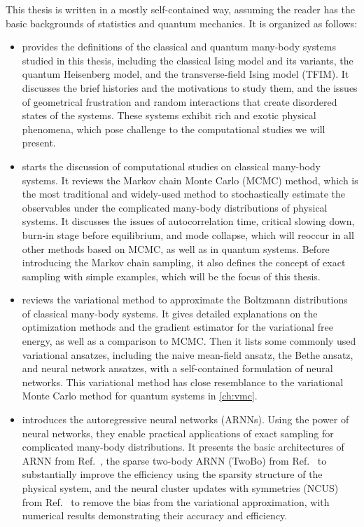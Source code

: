This thesis is written in a mostly self-contained way, assuming the reader has the basic backgrounds of statistics and quantum mechanics. It is organized as follows:
\begin{itemize}
\item {} provides the definitions of the classical and quantum many-body systems studied in this thesis, including the classical Ising model and its variants, the quantum Heisenberg model, and the transverse-field Ising model (TFIM).
It discusses the brief histories and the motivations to study them, and the issues of geometrical frustration and random interactions that create disordered states of the systems. These systems exhibit rich and exotic physical phenomena, which pose challenge to the computational studies we will present.
\item {} starts the discussion of computational studies on classical many-body systems. It reviews the Markov chain Monte Carlo (MCMC) method, which is the most traditional and widely-used method to stochastically estimate the observables under the complicated many-body distributions of physical systems.
It discusses the issues of autocorrelation time, critical slowing down, burn-in stage before equilibrium, and mode collapse, which will reoccur in all other methods based on MCMC, as well as in quantum systems.
Before introducing the Markov chain sampling, it also defines the concept of exact sampling with simple examples, which will be the focus of this thesis.
\item {} reviews the variational method to approximate the Boltzmann distributions of classical many-body systems.
It gives detailed explanations on the optimization methods and the gradient estimator for the variational free energy, as well as a comparison to MCMC.
Then it lists some commonly used variational ansatzes, including the naive mean-field ansatz, the Bethe ansatz, and neural network ansatzes, with a self-contained formulation of neural networks.
This variational method has close resemblance to the variational Monte Carlo method for quantum
systems in \cref{ch:vmc}.
\item {} introduces the autoregressive neural networks (ARNNs). Using the power of neural networks, they enable practical applications of exact sampling for complicated many-body distributions.
It presents the basic architectures of ARNN from Ref.~\cite{wu2019solving}, the sparse two-body ARNN (TwoBo) from Ref.~\cite{biazzo2024sparse} to substantially improve the efficiency using the sparsity structure of the physical system, and the neural cluster updates with symmetries (NCUS) from Ref.~\cite{wu2021unbiased} to remove the bias from the variational approximation, with numerical results demonstrating their accuracy and efficiency.

\end{itemize}
